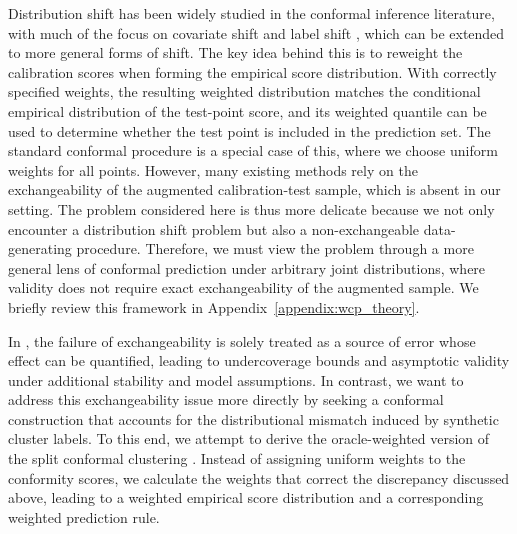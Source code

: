 \documentclass[11pt,letterpaper]{article}
\theoremstyle{definition}
\begin{document}
Distribution shift has been widely studied in the conformal inference literature, with much of the focus on covariate shift \cite{tibshirani2019conformal} and label shift \cite{podkopaev2021distribution,si2023pac}, which can be extended to more general forms of shift. The key idea behind this is to reweight the calibration scores when forming the empirical score distribution. With correctly specified weights, the resulting weighted distribution matches the conditional empirical distribution of the test-point score, and its weighted quantile can be used to determine whether the test point is included in the prediction set. The standard conformal procedure is a special case of this, where we choose uniform weights for all points. However, many existing methods rely on the exchangeability of the augmented calibration-test sample, which is absent in our setting. The problem considered here is thus more delicate because we not only encounter a distribution shift problem but also a non-exchangeable data-generating procedure. Therefore, we must view the problem through a more general lens of conformal prediction under arbitrary joint distributions, where validity does not require exact exchangeability of the augmented sample. We briefly review this framework in Appendix~\ref{appendix:wcp_theory}.

In \cite{hur2026inference}, the failure of exchangeability is solely treated as a source of error whose effect can be quantified, leading to undercoverage bounds and asymptotic validity under additional stability and model assumptions. In contrast, we want to address this exchangeability issue more directly by seeking a conformal construction that accounts for the distributional mismatch induced by synthetic cluster labels. To this end, we attempt to derive the oracle-weighted version of the split conformal clustering \cite{hur2026inference}. Instead of assigning uniform weights to the conformity scores, we calculate the weights that correct the discrepancy discussed above, leading to a weighted empirical score distribution and a corresponding weighted prediction rule.
\end{document}
